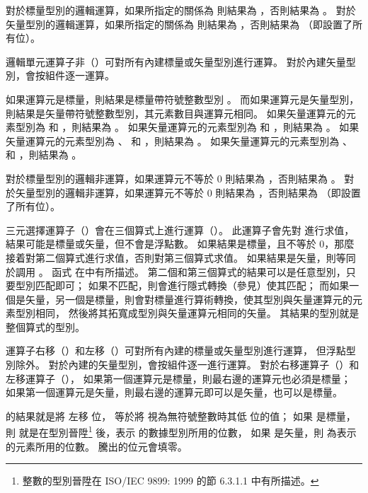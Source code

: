 {對於標量型別的邏輯運算，如果所指定的關係為  則結果為 ，否則結果為 。
對於矢量型別的邏輯運算，如果所指定的關係為  則結果為 ，否則結果為  （即設置了所有位）。
\stopitem

\startitem
邏輯單元運算子非（\ccmm{!}）可對所有內建標量或矢量型別進行運算。
對於內建矢量型別，會按組件逐一運算。

如果運算元是標量，則結果是標量帶符號整數型別 。
而如果運算元是矢量型別，則結果是矢量帶符號整數型別，其元素數目與運算元相同。
如果矢量運算元的元素型別為  和 ，則結果為 。
如果矢量運算元的元素型別為  和 ，則結果為 。
如果矢量運算元的元素型別為 、  和 ，則結果為 。
如果矢量運算元的元素型別為 、  和 ，則結果為 。

對於標量型別的邏輯非運算，如果運算元不等於 0 則結果為 ，否則結果為 。
對於矢量型別的邏輯非運算，如果運算元不等於 0 則結果為 ，否則結果為  （即設置了所有位）。
\stopitem

\startitem
三元選擇運算子（）會在三個算式上進行運算（）。
此運算子會先對  進行求值，結果可能是標量或矢量，但不會是浮點數。
如果結果是標量，且不等於 0，那麼接着對第二個算式進行求值，否則對第三個算式求值。
如果結果是矢量，則等同於調用 。
函式  在中有所描述。
第二個和第三個算式的結果可以是任意型別，只要型別匹配即可；
如果不匹配，則會進行隱式轉換（參見）使其匹配；
而如果一個是矢量，另一個是標量，則會對標量進行算術轉換，使其型別與矢量運算元的元素型別相同，
然後將其拓寬成型別與矢量運算元相同的矢量。
其結果的型別就是整個算式的型別。
\stopitem

\startitem
運算子右移（\ccmm{>>}）和左移（\ccmm{<<}）可對所有內建的標量或矢量型別進行運算，
但浮點型別除外。
對於內建的矢量型別，會按組件逐一進行運算。
對於右移運算子（\ccmm{>>}）和左移運算子（\ccmm{<<}），
如果第一個運算元是標量，則最右邊的運算元也必須是標量；
如果第一個運算元是矢量，則最右邊的運算元即可以是矢量，也可以是標量。

 的結果就是將  左移  位，
  等於將  視為無符號整數時其低  位的值；
如果  是標量，則  就是在型別晉陞\footnote{
整數的型別晉陞在 ISO/IEC 9899: 1999 的節 6.3.1.1 中有所描述。}
後，表示  的數據型別所用的位數，
如果  是矢量，則  為表示  的元素所用的位數。
騰出的位元會填零。

}
